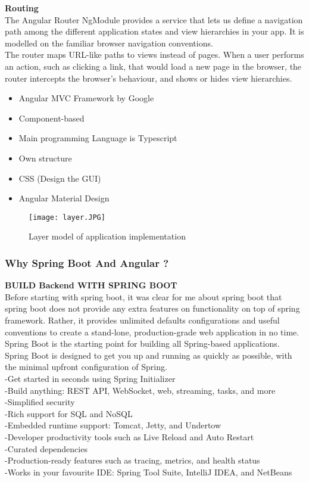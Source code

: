 \documentclass{scrartcl}
\begin{document}
\textbf{Routing}\\
The Angular Router NgModule provides a service that lets us define a navigation path among the different application states and view hierarchies in your app. It is modelled on the familiar browser navigation conventions.\\
The router maps URL-like paths to views instead of pages. When a user performs an action, such as clicking a link, that would load a new page in the browser, the router intercepts the browser's behaviour, and shows or hides view hierarchies.\\




\begin{itemize}
	\item	Angular MVC Framework by Google
	\item	Component-based
	\item	Main programming Language is Typescript
	\item	Own structure
	\item	CSS (Design the GUI)
	\item   Angular Material Design

\end{itemize}
\begin{figure}[H]
\centering
\texttt{[image: layer.JPG]}
\caption{Layer model of application implementation}
\label{layers}
\end{figure}

\subsubsection{Why Spring Boot And Angular ?}
\textbf{BUILD Backend WITH SPRING BOOT}\\
Before starting with spring boot, it was clear for me about spring boot that spring boot does not provide any extra features on functionality on top of spring framework. Rather, it provides unlimited defaults configurations and useful conventions to create a stand-lone, production-grade web application in no time.\\
Spring Boot is the starting point for building all Spring-based applications. Spring Boot is designed to get you up and running as quickly as possible, with the minimal upfront configuration of Spring.\\
 -Get started in seconds using Spring Initializer\\
-Build anything: REST API, WebSocket, web, streaming, tasks, and more\\
-Simplified security\\
-Rich support for SQL and NoSQL\\
-Embedded runtime support: Tomcat, Jetty, and Undertow\\
-Developer productivity tools such as Live Reload and Auto Restart\\
-Curated dependencies\\
-Production-ready features such as tracing, metrics, and health status\\
-Works in your favourite IDE: Spring Tool Suite, IntelliJ IDEA, and NetBeans\\
\end{document}
